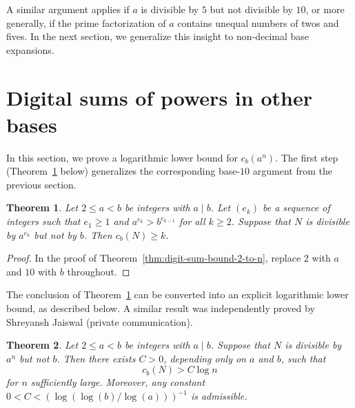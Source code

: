 \documentclass[12pt]{amsart}
\newtheorem{theorem}{Theorem}
\theoremstyle{remark}
\begin{document}
A similar argument applies if $a$ is divisible by $5$ but not divisible by $10$,
or more generally, if the prime factorization of $a$ contains unequal numbers
of twos and fives. In the next section, we generalize this insight to
non-decimal base expansions.

\section{Digital sums of powers in other bases} \label{sec:digital-sums-powers}

In this section, we prove a logarithmic lower bound for $c_b(a^n)$.
The first step (Theorem~\ref{thm:multiples-of-powers} below)
generalizes the corresponding base-$10$ argument from the previous section.

\begin{theorem} \label{thm:multiples-of-powers}
    Let $2 \le a < b$ be integers with $a \mid b$.
    Let $(e_{k})$ be a sequence of integers such that $e_{1} \ge 1$ and
    $a^{e_{k}} > b^{e_{k-1}}$ for all $k \ge 2$.
    Suppose that $N$ is divisible by $a^{e_{k}}$ but not by $b$.
    Then $c_b(N) \ge k$.
\end{theorem}

\begin{proof}
    In the proof of Theorem~\ref{thm:digit-sum-bound-2-to-n},
    replace $2$ with $a$ and $10$ with $b$ throughout.
\end{proof}

The conclusion of Theorem~\ref{thm:multiples-of-powers} can be converted
into an explicit logarithmic lower bound, as described below.
A similar result was independently proved by Shreyansh Jaiswal
(private communication).

\begin{theorem} \label{thm:multiples-powers-log-bound}
    Let $2 \le a < b$ be integers with $a \mid b$.
    Suppose that $N$ is divisible by $a^n$ but not $b$. Then
    there exists $C > 0$, depending only on $a$ and $b$, such that
    \[
        c_b(N) > C \log n
    \]
    for $n$ sufficiently large.
    Moreover, any constant $0 < C < (\log(\log(b)/\log(a)))^{-1}$ is admissible.
\end{theorem}
\end{document}
